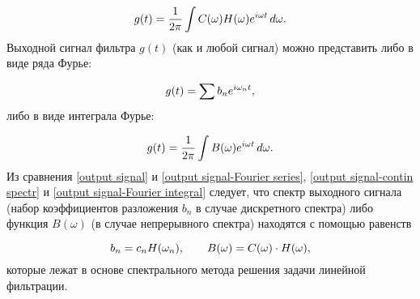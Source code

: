 \begin{enumerate}
\begin{equation}
	\eqmark{output signal-contin spectr}
	g(t)=\frac{1}{2\pi}\int C(\omega)H(\omega)e^{i\omega t}\,d\omega.
\end{equation}
Выходной сигнал фильтра $g(t)$ (как и любой сигнал) можно представить либо в виде ряда Фурье:

\begin{equation}
	\eqmark{output signal-Fourier series}
	g(t)=\sum b_n e^{i\omega_n t},
\end{equation}
либо в виде интеграла Фурье:

\begin{equation}
	\eqmark{output signal-Fourier integral}
	g(t)=\frac{1}{2\pi}\int B(\omega)e^{i\omega t}\,d\omega.
\end{equation}
Из сравнения \eqref{output signal} и \eqref{output signal-Fourier series}, \eqref{output signal-contin spectr} и \eqref{output signal-Fourier integral} следует, что спектр выходного сигнала (набор коэффициентов
разложения $b_n$ в случае дискретного спектра) либо функция $B(\omega)$ (в случае непрерывного спектра) находятся с
помощью равенств

\begin{equation}
	\eqmark{output signal-spectrum}
	b_n=c_n H(\omega_n),\qquad B(\omega)=C(\omega)\cdot H(\omega),
\end{equation}
которые лежат в основе спектрального метода решения задачи линейной фильтрации.
\end{enumerate}



